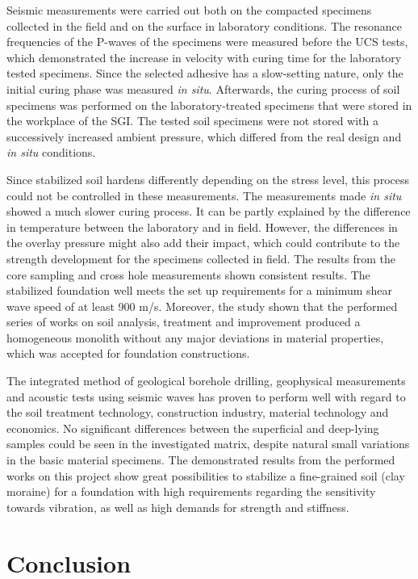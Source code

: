 \documentclass[USenglish,twocolumn]{article}
\begin{document}
Seismic measurements were carried out both on the compacted specimens collected in the field and on the surface in laboratory conditions. The resonance frequencies of the P-waves of the specimens were measured before the UCS tests, which demonstrated the increase in velocity with curing time for the laboratory tested specimens. Since the selected adhesive has a slow-setting nature, only the initial curing phase was measured \emph{in situ}. Afterwards, the curing process of soil specimens was performed on the laboratory-treated specimens that were stored in the workplace of the SGI. The tested soil specimens were not stored with a successively increased ambient pressure, which differed from the real design and \emph{in situ} conditions. 

Since stabilized soil hardens differently depending on the stress level, this process could not be controlled in these measurements. The measurements made \emph{in situ} showed a much slower curing process. It can be partly explained by the difference in temperature  between the laboratory and in field. However, the differences in the overlay pressure might also add their impact, which could contribute to the strength development for the specimens collected in field. The results from the core sampling and cross hole measurements shown consistent results. The stabilized foundation well meets the set up requirements for a minimum shear wave speed of at least 900 m/s. Moreover, the study shown that the performed series of works on soil analysis, treatment and improvement produced a homogeneous monolith without any major deviations in material properties, which was accepted for foundation constructions. 

The integrated method of geological borehole drilling, geophysical measurements and acoustic tests using seismic waves has proven to perform well with regard to the soil treatment technology, construction industry, material technology and economics. No significant differences between the superficial and deep-lying samples could be seen in the investigated matrix, despite natural small variations in the basic material specimens. The demonstrated results from the performed works on this project show great possibilities to stabilize a fine-grained soil (clay moraine) for a  foundation with high requirements regarding the sensitivity towards vibration, as well as high demands for strength and stiffness.

\section{Conclusion}\label{sec:7}
\end{document}
